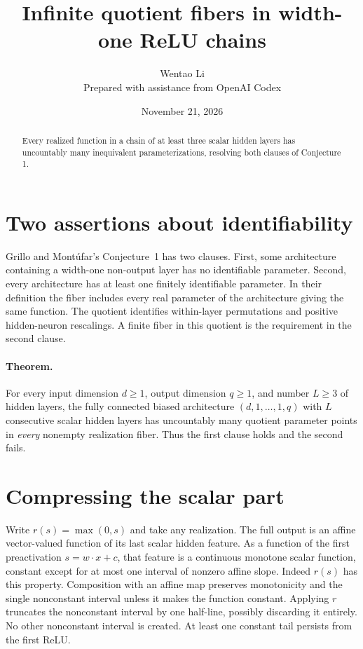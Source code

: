 \documentclass[11pt]{article}
\title{Infinite quotient fibers in width-one ReLU chains}
\author{Wentao Li\\{\small Prepared with assistance from OpenAI Codex}}
\date{November 21, 2026}
\begin{document}
\maketitle
\begin{abstract}
Every realized function in a chain of at least three scalar hidden layers has uncountably many inequivalent parameterizations, resolving both clauses of Conjecture 1.
\end{abstract}
\section*{Two assertions about identifiability}
Grillo and Mont\'ufar's Conjecture~1 has two clauses. First, some architecture containing a width-one non-output layer has no identifiable parameter. Second, every architecture has at least one finitely identifiable parameter. In their definition the fiber includes every real parameter of the architecture giving the same function. The quotient identifies within-layer permutations and positive hidden-neuron rescalings. A finite fiber in this quotient is the requirement in the second clause.

\paragraph{Theorem.} For every input dimension $d\ge1$, output dimension $q\ge1$, and number $L\ge3$ of hidden layers, the fully connected biased architecture $(d,1,\ldots,1,q)$ with $L$ consecutive scalar hidden layers has uncountably many quotient parameter points in \emph{every} nonempty realization fiber. Thus the first clause holds and the second fails.

\section*{Compressing the scalar part}
Write $r(s)=\max(0,s)$ and take any realization. The full output is an affine vector-valued function of its last scalar hidden feature. As a function of the first preactivation $s=w\cdot x+c$, that feature is a continuous monotone scalar function, constant except for at most one interval of nonzero affine slope. Indeed $r(s)$ has this property. Composition with an affine map preserves monotonicity and the single nonconstant interval unless it makes the function constant. Applying $r$ truncates the nonconstant interval by one half-line, possibly discarding it entirely. No other nonconstant interval is created. At least one constant tail persists from the first ReLU.
\end{document}
